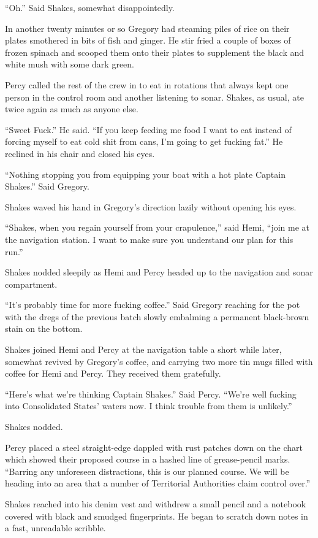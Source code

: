 \documentclass[
]{scrbook}
\begin{document}
``Oh.'' Said Shakes, somewhat disappointedly.

In another twenty minutes or so Gregory had steaming piles of rice on
their plates smothered in bits of fish and ginger. He stir fried a
couple of boxes of frozen spinach and scooped them onto their plates to
supplement the black and white mush with some dark green.

Percy called the rest of the crew in to eat in rotations that always
kept one person in the control room and another listening to sonar.
Shakes, as usual, ate twice again as much as anyone else.

``Sweet Fuck.'' He said. ``If you keep feeding me food I want to eat
instead of forcing myself to eat cold shit from cans, I'm going to get
fucking fat.'' He reclined in his chair and closed his eyes.

``Nothing stopping you from equipping your boat with a hot plate Captain
Shakes.'' Said Gregory.

Shakes waved his hand in Gregory's direction lazily without opening his
eyes.

``Shakes, when you regain yourself from your crapulence,'' said Hemi,
``join me at the navigation station. I want to make sure you understand
our plan for this run.''

Shakes nodded sleepily as Hemi and Percy headed up to the navigation and
sonar compartment.

``It's probably time for more fucking coffee.'' Said Gregory reaching
for the pot with the dregs of the previous batch slowly embalming a
permanent black-brown stain on the bottom.

Shakes joined Hemi and Percy at the navigation table a short while
later, somewhat revived by Gregory's coffee, and carrying two more tin
mugs filled with coffee for Hemi and Percy. They received them
gratefully.

``Here's what we're thinking Captain Shakes.'' Said Percy. ``We're well
fucking into Consolidated States' waters now. I think trouble from them
is unlikely.''

Shakes nodded.

Percy placed a steel straight-edge dappled with rust patches down on the
chart which showed their proposed course in a hashed line of
grease-pencil marks. ``Barring any unforeseen distractions, this is our
planned course. We will be heading into an area that a number of
Territorial Authorities claim control over.''

Shakes reached into his denim vest and withdrew a small pencil and a
notebook covered with black and smudged fingerprints. He began to
scratch down notes in a fast, unreadable scribble.
\end{document}
